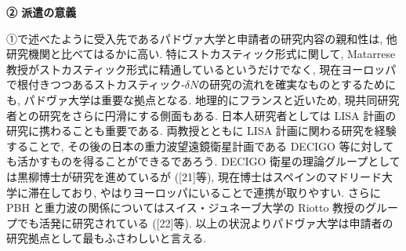\documentclass[11pt,a4paper,uplatex,twoside,dvipdfmx]{ujarticle} 	%
\newcommand{\研究課題名}{\mgfamily ストカスティック形式、原始ブラックホール、重力波観測から迫るインフレーション}
\newcommand{\研究機関名}{\mgfamily 名古屋大学}
\newcommand{\申請者氏名}{\mgfamily 多田 祐一郎}
\newcommand{\研究代表者氏名}{\申請者氏名}
\newcommand{\研究期間の最終元号年度}{34}	%
\begin{document}
{	
	
	\begin{mdframed}[roundcorner=0.5zw,
	innertopmargin=0.8zw,innerbottommargin=0.8zw,
	linecolor=black!50,linewidth=0.2zw,
	backgroundcolor=black!10]
	{\bfseries\gtfamily\sffamily\large ② 派遣の意義}
	\end{mdframed}
	
	\vspace{-10pt}
	①で述べたように受入先であるパドヴァ大学と申請者の研究内容の親和性は, 他研究機関と比べてはるかに高い.
	特にストカスティック形式に関して, Matarrese 教授がストカスティック形式に精通しているというだけでなく,
	現在ヨーロッパで根付きつつあるストカスティック-$\delta N$の研究の流れを確実なものとするためにも,
	パドヴァ大学は重要な拠点となる. 地理的にフランスと近いため, 現共同研究者との研究をさらに円滑にする側面もある.
	日本人研究者としては LISA 計画の研究に携わることも重要である.
	両教授とともに LISA 計画に関わる研究を経験することで, その後の日本の重力波望遠鏡衛星計画である DECIGO 等に対しても活かすものを得ることができるであろう.
	DECIGO 衛星の理論グループとしては黒柳博士が研究を進めているが ([21]等), 現在博士はスペインのマドリード大学に滞在しており, やはりヨーロッパにいることで連携が取りやすい.
	さらに PBH と重力波の関係についてはスイス・ジュネーブ大学の Riotto 教授のグループでも活発に研究されている ([22]等).
	以上の状況よりパドヴァ大学は申請者の研究拠点として最もふさわしいと言える.
	
	
	
}
\end{document}
